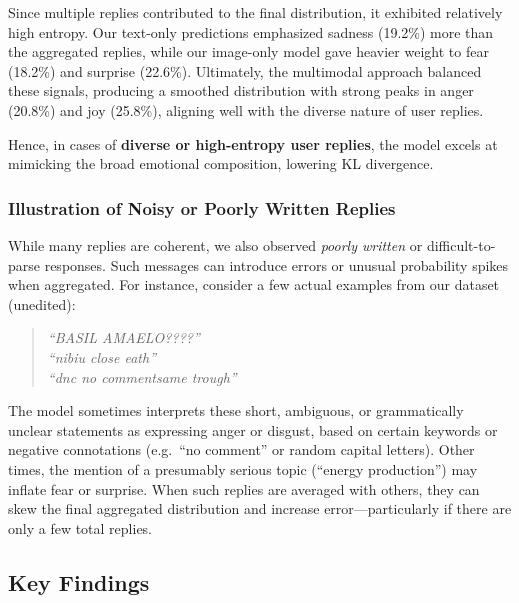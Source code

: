 Since multiple replies contributed to the final distribution, it exhibited relatively high entropy. Our text-only predictions emphasized sadness (19.2\%) more than the aggregated replies, while our image-only model gave heavier weight to fear (18.2\%) and surprise (22.6\%). Ultimately, the multimodal approach balanced these signals, producing a smoothed distribution with strong peaks in anger (20.8\%) and joy (25.8\%), aligning well with the diverse nature of user replies.
\newline

Hence, in cases of \textbf{diverse or high-entropy user replies}, the model excels at mimicking the broad emotional composition, lowering KL divergence.

\vspace{1em}
\subsubsection*{Illustration of Noisy or Poorly Written Replies}

While many replies are coherent, we also observed \emph{poorly written} or difficult-to-parse responses. Such messages can introduce errors or unusual probability spikes when aggregated. For instance, consider a few actual examples from our dataset (unedited):

\begin{quote}
\emph{``BASIL AMAELO????''} \\
\emph{``nibiu close eath''} \\
\emph{``dnc no commentsame trough''} \\
\end{quote}

The model sometimes interprets these short, ambiguous, or grammatically unclear statements as expressing anger or disgust, based on certain keywords or negative connotations (e.g.\ ``no comment'' or random capital letters). Other times, the mention of a presumably serious topic (``energy production'') may inflate fear or surprise. When such replies are averaged with others, they can skew the final aggregated distribution and increase error—particularly if there are only a few total replies.

\bigskip


\subsection{Key Findings}
